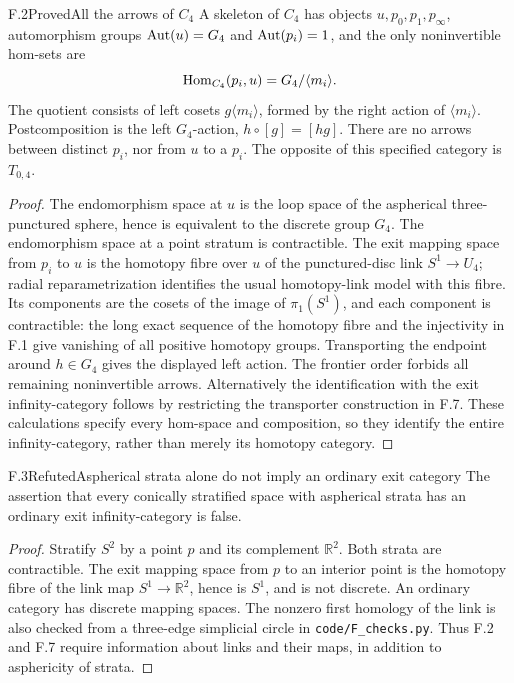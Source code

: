 \begin{statement}{F.2}{Proved}{All the arrows of $C_4$}
A skeleton of $C_4$ has objects $u,p_0,p_1,p_\infty$, automorphism groups
$\operatorname{Aut}(u)=G_4$ and $\operatorname{Aut}(p_i)=1$, and the only noninvertible hom-sets are
\[
 \operatorname{Hom}_{C_4}(p_i,u)=G_4/\langle m_i\rangle.
\]
The quotient consists of left cosets $g\langle m_i\rangle$, formed by
the right action of $\langle m_i\rangle$.  Postcomposition is the left
$G_4$-action, $h\circ[g]=[hg]$.  There are no arrows between distinct
$p_i$, nor from $u$ to a $p_i$.  The opposite of this specified category
is $T_{0,4}$.
\end{statement}
\begin{proof}
The endomorphism space at $u$ is the loop space of the aspherical
three-punctured sphere, hence is equivalent to the discrete group $G_4$.
The endomorphism space at a point stratum is contractible.  The exit
mapping space from $p_i$ to $u$ is the homotopy fibre over $u$ of the
punctured-disc link $S^1\longrightarrow U_4$; radial reparametrization
identifies the usual homotopy-link model with this fibre.  Its components
are the cosets of the image of $\pi_1(S^1)$, and each component is
contractible: the long exact sequence of the homotopy fibre and the
injectivity in F.1 give vanishing of all positive homotopy groups.
Transporting the endpoint around $h\in G_4$ gives the displayed left
action.  The frontier order forbids all remaining noninvertible arrows.
Alternatively the identification with the exit infinity-category follows
by restricting the transporter construction in F.7.  These calculations
specify every hom-space and composition, so they identify the entire
infinity-category, rather than merely its homotopy category.
\end{proof}

\begin{statement}{F.3}{Refuted}{Aspherical strata alone do not imply an
ordinary exit category}
The assertion that every conically stratified space with aspherical
strata has an ordinary exit infinity-category is false.
\end{statement}
\begin{proof}
Stratify $S^2$ by a point $p$ and its complement $\mathbb R^2$.  Both
strata are contractible.  The exit mapping space from $p$ to an interior
point is the homotopy fibre of the link map
$S^1\longrightarrow\mathbb R^2$, hence is $S^1$, and is not discrete.
An ordinary category has discrete mapping spaces.  The nonzero first
homology of the link is also checked from a three-edge simplicial circle
in \texttt{code/F\_checks.py}.  Thus F.2 and F.7 require information about
links and their maps, in addition to asphericity of strata.
\end{proof}

